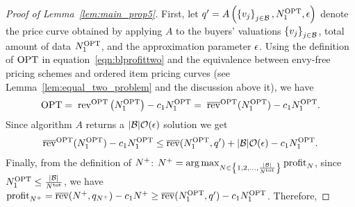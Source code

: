 


\Lempropfive*


\begin{proof}[Proof of Lemma~\ref{lem:main_prop5}]
First, let $q' = A\left(\left\{v_{j}\right\}_{j \in \mathcal{B}},N_1^{\rm OPT},\epsilon\right) $ denote the price curve obtained by applying $A$ to the buyers' valuations $\left\{v_{j}\right\}_{j \in \mathcal{B}}$, total amount of data $N_1^{\rm OPT}$, and the approximation parameter $\epsilon$. 
Using the definition of ${\rm OPT}$ in equation~\eqref{eqn:blprofittwo} and the equivalence between envy-free pricing schemes and ordered item pricing curves (see Lemma~\ref{lem:equal_two_problem} and the discussion above it), we have
   \begin{equation*}     
      {\rm OPT} 
      = \;\mathrm{rev}^{\rm OPT}\left(N_1^{\rm OPT}\right) - c_1N_1^{\rm OPT}  = \; \overline{\mathrm{rev}}^{\rm OPT}(N_1^{\rm OPT}) - c_1N_1^{\rm OPT}  .
   \end{equation*}
Since algorithm $A$ returns a $|\mathcal{B}|\mathcal{O}(\epsilon)$ solution we get
\begin{align*}
    \overline{\mathrm{rev}}^{\rm OPT}(N_1^{\rm OPT}) - c_1N_1^{\rm OPT}
    \leq
    \overline{\mathrm{rev}}(N_1^{\rm OPT}, q') + |\mathcal{B}|\mathcal{O}(\epsilon)- c_1N_1^{\rm OPT} .
\end{align*}
Finally, from the definition of $N^{+}$: $  N^{+} = \arg\max_{N \in \left\{1,2,\dots, \frac{|\mathcal{B}|}{N^{\rm tot}}\right\} } {\rm profit}_N $, since $N_1^{\rm OPT} \leq \frac{|\mathcal{B}|}{N^{\rm tot}}$, we have $ {\rm profit}_{N^{+}} =\overline{\mathrm{rev}}(N^{+}, q_{N^{+}})- c_1 N^{+}  \geq  \overline{\mathrm{rev}}(N_1^{\rm OPT}, q') - c_1 N_1^{\rm OPT} $. Therefore,

\end{proof}
